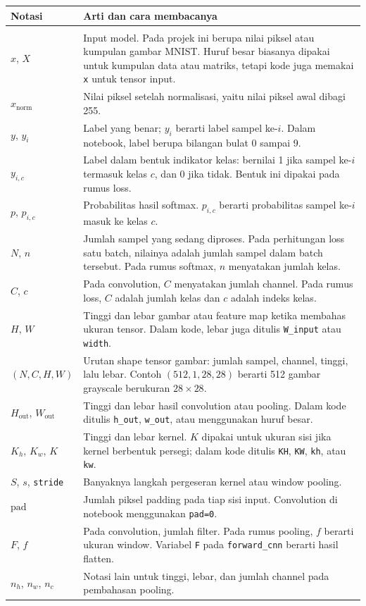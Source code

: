 \documentclass[12pt, letterpaper]{article}
\begin{document}
\begingroup
\small
\renewcommand{\arraystretch}{1.2}
\begin{longtable}{@{}>{\raggedright\arraybackslash}p{}>{\raggedright\arraybackslash}p{}@{}}
\textbf{Notasi} & \textbf{Arti dan cara membacanya} \\
\hline
\endhead
\multicolumn{2}{@{}l}{\textbf{Data dan ukuran tensor}} \\
$x$, $X$ & Input model. Pada projek ini berupa nilai piksel atau kumpulan gambar MNIST. Huruf besar biasanya dipakai untuk kumpulan data atau matriks, tetapi kode juga memakai \texttt{x} untuk tensor input. \\
$x_{\text{norm}}$ & Nilai piksel setelah normalisasi, yaitu nilai piksel awal dibagi 255. \\
$y$, $y_i$ & Label yang benar; $y_i$ berarti label sampel ke-$i$. Dalam notebook, label berupa bilangan bulat 0 sampai 9. \\
$y_{i,c}$ & Label dalam bentuk indikator kelas: bernilai 1 jika sampel ke-$i$ termasuk kelas $c$, dan 0 jika tidak. Bentuk ini dipakai pada rumus loss. \\
$p$, $p_{i,c}$ & Probabilitas hasil softmax. $p_{i,c}$ berarti probabilitas sampel ke-$i$ masuk ke kelas $c$. \\
$N$, $n$ & Jumlah sampel yang sedang diproses. Pada perhitungan loss satu batch, nilainya adalah jumlah sampel dalam batch tersebut. Pada rumus softmax, $n$ menyatakan jumlah kelas. \\
$C$, $c$ & Pada convolution, $C$ menyatakan jumlah channel. Pada rumus loss, $C$ adalah jumlah kelas dan $c$ adalah indeks kelas. \\
$H$, $W$ & Tinggi dan lebar gambar atau feature map ketika membahas ukuran tensor. Dalam kode, lebar juga ditulis \texttt{W\_input} atau \texttt{width}. \\
$(N,C,H,W)$ & Urutan shape tensor gambar: jumlah sampel, channel, tinggi, lalu lebar. Contoh $(512,1,28,28)$ berarti 512 gambar grayscale berukuran $28\times28$. \\
$H_{\text{out}}$, $W_{\text{out}}$ & Tinggi dan lebar hasil convolution atau pooling. Dalam kode ditulis \texttt{h\_out}, \texttt{w\_out}, atau menggunakan huruf besar. \\
$K_h$, $K_w$, $K$ & Tinggi dan lebar kernel. $K$ dipakai untuk ukuran sisi jika kernel berbentuk persegi; dalam kode ditulis \texttt{KH}, \texttt{KW}, \texttt{kh}, atau \texttt{kw}. \\
$S$, $s$, \texttt{stride} & Banyaknya langkah pergeseran kernel atau window pooling. \\
$\text{pad}$ & Jumlah piksel padding pada tiap sisi input. Convolution di notebook menggunakan \texttt{pad=0}. \\
$F$, $f$ & Pada convolution, jumlah filter. Pada rumus pooling, $f$ berarti ukuran window. Variabel \texttt{F} pada \texttt{forward\_cnn} berarti hasil flatten. \\
$n_h$, $n_w$, $n_c$ & Notasi lain untuk tinggi, lebar, dan jumlah channel pada pembahasan pooling. \\
\end{longtable}
\end{document}
